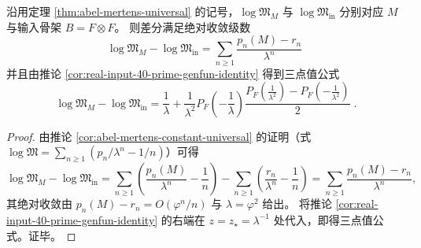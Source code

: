 \begin{corollary}\label{cor:real-input-40-logM-fast-prime}
沿用定理 \ref{thm:abel-mertens-universal} 的记号，\(\log\mathfrak{M}_M\) 与 \(\log\mathfrak{M}_{\mathrm{in}}\) 分别对应 \(M\) 与输入骨架 \(B=F\otimes F\)。
则差分满足绝对收敛级数
\[
\boxed{\;
\log\mathfrak{M}_M-\log\mathfrak{M}_{\mathrm{in}}
=\sum_{n\ge 1}\frac{p_n(M)-r_n}{\lambda^n}\;}
\]
并且由推论 \ref{cor:real-input-40-prime-genfun-identity} 得到三点值公式
\[
\boxed{\;
\log\mathfrak{M}_M-\log\mathfrak{M}_{\mathrm{in}}
=\frac{1}{\lambda}+\frac{1}{\lambda^2}
P_F\!\left(-\frac{1}{\lambda}\right)
\frac{
P_F\!\left(\frac{1}{\lambda^2}\right)-P_F\!\left(-\frac{1}{\lambda^2}\right)
}{2}\; }.
\]
\end{corollary}
\begin{proof}
由推论 \ref{cor:abel-mertens-constant-universal} 的证明（式 \(\log\mathfrak{M}=\sum_{n\ge 1}(p_n/\lambda^n-1/n)\)）可得
\[
\log\mathfrak{M}_M-\log\mathfrak{M}_{\mathrm{in}}
=\sum_{n\ge 1}\left(\frac{p_n(M)}{\lambda^n}-\frac{1}{n}\right)
-\sum_{n\ge 1}\left(\frac{r_n}{\lambda^n}-\frac{1}{n}\right)
=\sum_{n\ge 1}\frac{p_n(M)-r_n}{\lambda^n},
\]
其绝对收敛由 \(p_n(M)-r_n=O(\varphi^n/n)\) 与 \(\lambda=\varphi^2\) 给出。
将推论 \ref{cor:real-input-40-prime-genfun-identity} 的右端在 \(z=z_\star=\lambda^{-1}\) 处代入，即得三点值公式。证毕。
\end{proof}

